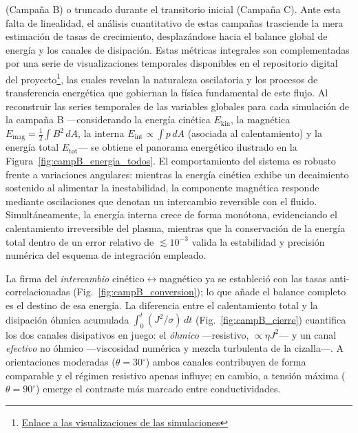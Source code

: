 (Campaña B) o truncado durante el transitorio inicial (Campaña C). Ante esta falta de linealidad, el análisis cuantitativo de estas campañas trasciende la mera estimación de tasas de crecimiento, desplazándose hacia el balance global de energía y los canales de disipación. Estas métricas integrales son complementadas por una serie de visualizaciones temporales disponibles en el repositorio digital del proyecto\footnote{\href{https://github.com/Sebrodriguezg/KHI/tree/revision-monografia/03_movies}{Enlace a las visualizaciones de las simulaciones}}, las cuales revelan la naturaleza oscilatoria y los procesos de transferencia energética que gobiernan la física fundamental de este flujo.
Al reconstruir las series temporales de las variables globales para cada simulación de la campaña B —considerando la energía cinética $E_{\mathrm{kin}}$, la magnética $E_{\mathrm{mag}}=\tfrac12\int B^2\,dA$, la interna $E_{\mathrm{int}}\propto\int p\,dA$ (asociada al calentamiento) y la energía total $E_{\mathrm{tot}}$— se obtiene el panorama energético ilustrado en la Figura~\ref{fig:campB_energia_todos}. El comportamiento del sistema es robusto frente a variaciones angulares: mientras la energía cinética exhibe un decaimiento sostenido al alimentar la inestabilidad, la componente magnética responde mediante oscilaciones que denotan un intercambio reversible con el fluido. Simultáneamente, la energía interna crece de forma monótona, evidenciando el calentamiento irreversible del plasma, mientras que la conservación de la energía total dentro de un error relativo de $\lesssim 10^{-3}$ valida la estabilidad y precisión numérica del esquema de integración empleado.



La firma del \emph{intercambio} cinético$\leftrightarrow$magnético ya se estableció con las tasas anti-correlacionadas (Fig.~\ref{fig:campB_conversion}); lo que añade el balance completo es el destino de esa energía. La diferencia entre el calentamiento total y la disipación óhmica acumulada $\int_0^{t}(J^2/\sigma)\,dt$ (Fig.~\ref{fig:campB_cierre}) cuantifica los dos canales disipativos en juego: el \emph{óhmico} ---resistivo, $\propto\eta J^2$--- y un canal \emph{efectivo} no óhmico ---viscosidad numérica y mezcla turbulenta de la cizalla---. A orientaciones moderadas ($\theta=30^\circ$) ambos canales contribuyen de forma comparable y el régimen resistivo apenas influye; en cambio, a tensión máxima ($\theta=90^\circ$) emerge el contraste más marcado entre conductividades.



